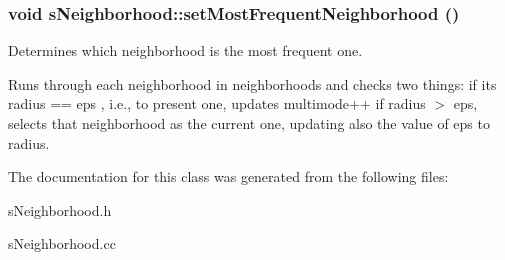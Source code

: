 \subsubsection{\setlength{\rightskip}{0pt plus 5cm}void s\-Neighborhood::set\-Most\-Frequent\-Neighborhood ()}\label{classsNeighborhood_a2}


Determines which neighborhood is the most frequent one. 

Runs through each neighborhood in neighborhoods and checks two things: if its radius == eps , i.e., to present one, updates multimode++ if radius $>$ eps, selects that neighborhood as the current one, updating also the value of eps to radius.

The documentation for this class was generated from the following files:\begin{CompactItemize}
\item 
s\-Neighborhood.h\item 
s\-Neighborhood.cc\end{CompactItemize}
